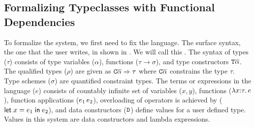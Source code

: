 \documentclass[format=acmsmall,manuscript,review,screen,nonacm,margin=1in,11pt]{acmart}
\begin{document}
\subsection{Formalizing Typeclasses with Functional Dependencies}\label{subsec:tc-formal}
To formalize the system, we first need to fix the language.
The surface syntax, the one that the user writes, in shown in .
We will call this \TCFD{}.
The syntax of types ($\tau$) consists of  type variables ($\alpha$),
functions ($\tau\to\sigma$), and type constructors $\texttt{T}\overline{\alpha}$.
The qualified types ($\rho$) are given as $\texttt{C}\overline{\alpha}\Rightarrow\tau$
where $\texttt{C}\overline{\alpha}$ constrains the type $\tau$. Type schemes ($\sigma$) are quantified constraint types.
The terms or expressions in the language ($e$) consists of countably
infinite set of variables ($x, y$), functions ($\lambda x{:}\tau.\, e$),
function applications ($e_1\, e_2$), overloading of operators is achieved by ($\mathsf{let}\;x = e_1\;\mathsf{in}\;e_2$), and
data constructors ($\texttt{D}$) define values for a user defined type.
Values in this system are data constructors and lambda expressions.
\end{document}
